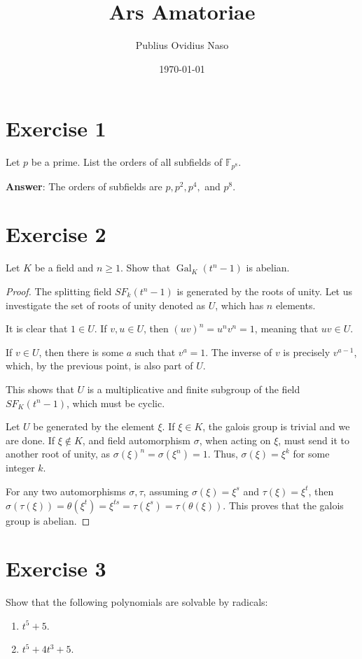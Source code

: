 \documentclass{article}
\title{Ars Amatoriae}
\author{Publius Ovidius Naso}
\date{\today}
\theoremstyle{definition}
\theoremstyle{definition}
\theoremstyle{remark}
\begin{document}
\section*{Exercise 1}

Let $p$ be a prime. List the orders of all subfields of $\mathbb{F}_{p^8}$.

\textbf{Answer}:
The orders of subfields are $p, p^2, p^4,$ and $p^8$.

\section*{Exercise 2}
Let $K$ be a field and $n \geq 1$. Show that $\operatorname{Gal}_K(t^n - 1)$ is abelian.

\begin{proof}
	The splitting field $SF_k(t^n - 1)$ is generated by the roots of unity. 
	Let us investigate the set of roots of unity denoted as $U$, which has $n$ elements.

	It is clear that $1 \in U$. 
	If $v, u \in U$, then $(uv)^n = u^n v^n = 1$, meaning that $uv \in U$.

	If $v \in U$, then there is some $a$ such that $v^a = 1$. 
	The inverse of $v$ is precisely $v^{a-1}$, which, by the previous point, is also part of $U$. 

	This shows that $U$ is a multiplicative and finite subgroup of the field $SF_K(t^n-1)$, which must be cyclic. 

	Let $U$ be generated by the element $\xi$. 
	If $\xi \in K$, the galois group is trivial and we are done.
	If $\xi \notin K$, and field automorphism $\sigma$, when acting on $\xi$, must send it to another root of unity, as $\sigma(\xi)^n = \sigma(\xi^n) = 1$. 
	Thus, $\sigma(\xi) = \xi^k$ for some integer $k$.

	For any two automorphisms $\sigma, \tau$, assuming $\sigma(\xi) = \xi^s$ and $\tau(\xi) = \xi^t$, then $\sigma(\tau(\xi)) = \theta(\xi^t) = \xi^{ts} =  \tau(\xi^s) = \tau(\theta(\xi))$.
	This proves that the galois group is abelian.
\end{proof}

\section*{Exercise 3}
Show that the following polynomials are solvable by radicals:
\begin{enumerate}
    \item $t^5 + 5$.
    \item $t^5 + 4t^3 + 5$.
\end{enumerate}
\end{document}
